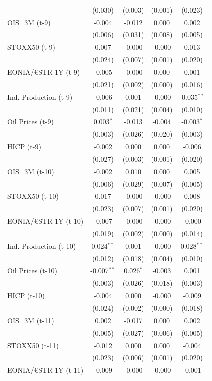 \begin{longtable}[t]{lcccc}
 & (0.030) & (0.003) & (0.001) & (0.023)\\
OIS\_3M (t-9) & -0.004 & -0.012 & 0.000 & 0.002\\
 & (0.006) & (0.031) & (0.008) & (0.005)\\
STOXX50 (t-9) & 0.007 & -0.000 & -0.000 & 0.013\\
 & (0.024) & (0.007) & (0.001) & (0.020)\\
EONIA/€STR 1Y (t-9) & -0.005 & -0.000 & 0.000 & 0.001\\
 & (0.021) & (0.002) & (0.000) & (0.016)\\
Ind. Production (t-9) & -0.006 & 0.001 & -0.000 & -0.035$^{**}$\\
 & (0.011) & (0.021) & (0.004) & (0.010)\\
Oil Prices (t-9) & 0.003$^{*}$ & -0.013 & -0.004 & -0.003$^{*}$\\
 & (0.003) & (0.026) & (0.020) & (0.003)\\
HICP (t-9) & -0.002 & 0.000 & 0.000 & -0.006\\
 & (0.027) & (0.003) & (0.001) & (0.020)\\
OIS\_3M (t-10) & -0.002 & 0.010 & 0.000 & 0.005\\
 & (0.006) & (0.029) & (0.007) & (0.005)\\
STOXX50 (t-10) & 0.017 & -0.000 & -0.000 & 0.008\\
 & (0.023) & (0.007) & (0.001) & (0.020)\\
EONIA/€STR 1Y (t-10) & -0.007 & -0.000 & -0.000 & -0.000\\
 & (0.019) & (0.002) & (0.000) & (0.014)\\
Ind. Production (t-10) & 0.024$^{**}$ & 0.001 & -0.000 & 0.028$^{**}$\\
 & (0.012) & (0.018) & (0.004) & (0.010)\\
Oil Prices (t-10) & -0.007$^{**}$ & 0.026$^{*}$ & -0.003 & 0.001\\
 & (0.003) & (0.026) & (0.018) & (0.003)\\
HICP (t-10) & -0.004 & 0.000 & -0.000 & -0.009\\
 & (0.024) & (0.002) & (0.000) & (0.018)\\
OIS\_3M (t-11) & 0.002 & -0.017 & 0.000 & 0.002\\
 & (0.005) & (0.027) & (0.006) & (0.005)\\
STOXX50 (t-11) & -0.012 & 0.000 & 0.000 & -0.004\\
 & (0.023) & (0.006) & (0.001) & (0.020)\\
EONIA/€STR 1Y (t-11) & -0.009 & -0.000 & -0.000 & -0.001\\

\end{longtable}
